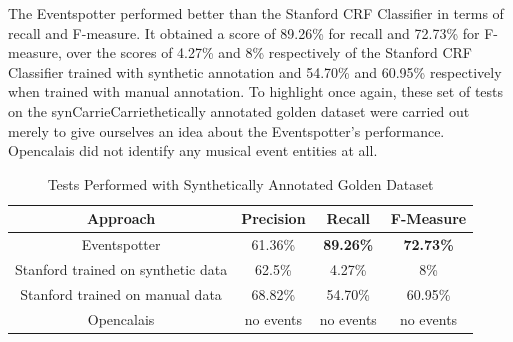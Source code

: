 \documentclass[a4paper,11pt]{report}
\begin{document}
The Eventspotter performed better than the Stanford CRF Classifier in terms of recall and F-measure. It obtained a score of 89.26\% for recall and 72.73\% for F-measure, over the scores of 4.27\% and 8\% respectively of the Stanford CRF Classifier trained with synthetic annotation and 54.70\% and 60.95\% respectively when trained with manual annotation. To highlight once again, these set of tests on the synCarrieCarriethetically annotated golden dataset were carried out merely to give ourselves an idea about the Eventspotter's performance. Opencalais did not identify any musical event entities at all.
\begin{table}[ht]
\caption{Tests Performed with Synthetically Annotated Golden Dataset} %
\centering %
\begin{tabular}{c c c c} %
\hline\hline %
Approach & Precision & Recall & F-Measure \\ [0.5ex] %
\hline %
Eventspotter & 61.36\% & \bf 89.26\% \bf & \bf 72.73\% \bf \\ %
Stanford trained on synthetic data & 62.5\% & 4.27\% & 8\%\\
Stanford trained on manual data & 68.82\% & 54.70\% & 60.95\%  \\
Opencalais & no events & no events & no events \\
\hline %
\end{tabular}
\label{table:nonlin} %
\end{table}
\end{document}
